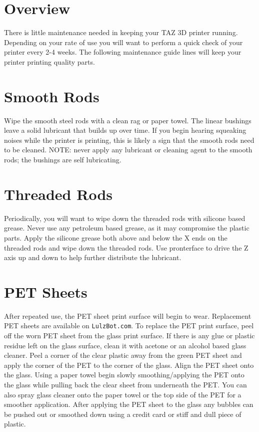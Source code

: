 \section{Overview}
There is little maintenance needed in keeping your TAZ 3D printer running. Depending on your rate of use you will want to perform a quick check of your printer every 2-4 weeks. The following maintenance guide lines will keep your printer printing quality parts.

\section{Smooth Rods}
Wipe the smooth steel rods with a clean rag or paper towel. The linear bushings leave a solid lubricant that builds up over time. If you begin hearing squeaking noises while the printer is printing, this is likely a sign that the smooth rods need to be cleaned. NOTE: never apply any lubricant or cleaning agent to the smooth rods; the bushings are self lubricating.

\section{Threaded Rods}
Periodically, you will want to wipe down the threaded rods with silicone based grease. Never use any petroleum based grease, as it may compromise the plastic parts. Apply the silicone grease both above and below the X ends on the threaded rods and wipe down the threaded rods. Use pronterface to drive the Z axis up and down to help further distribute the lubricant.

\section{PET Sheets}
After repeated use, the PET sheet print surface will begin to wear. Replacement PET sheets are available on \texttt{LulzBot.com}. To replace the PET print surface, peel off the worn PET sheet from the glass print surface. If there is any glue or plastic residue left on the glass surface, clean it with acetone or an alcohol based glass cleaner. Peel a corner of the clear plastic away from the green PET sheet and apply the corner of the PET to the corner of the glass. Align the PET sheet onto the glass. Using a paper towel begin slowly smoothing/applying the PET onto the glass while pulling back the clear sheet from underneath the PET. You can also spray glass cleaner onto the paper towel or the top side of the PET for a smoother application. After applying the PET sheet to the glass any bubbles can be pushed out or smoothed down using a credit card or stiff and dull piece of plastic.

